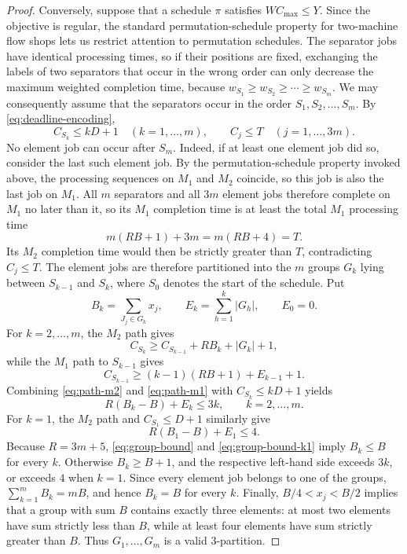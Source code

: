 \documentclass[12pt]{article}
\begin{document}
\begin{sloppypar}
\begin{proof}
Conversely, suppose that a schedule $\pi$ satisfies $W C_{\max}\le Y$. Since the objective is regular,
the standard permutation-schedule property for two-machine flow shops lets us restrict attention to
permutation schedules. The separator jobs have identical processing times, so if their positions are
fixed, exchanging the labels of two separators that occur in the wrong order can only decrease the
maximum weighted completion time, because $w_{S_1}\ge w_{S_2}\ge\cdots\ge w_{S_m}$. We may
consequently assume that the separators occur in the order $S_1,S_2,\dots,S_m$.
By \cref{eq:deadline-encoding},
\[
 C_{S_k}\le kD+1\quad(k=1,\dots,m),
 \qquad C_j\le T\quad(j=1,\dots,3m).
\]
No element job can occur after $S_m$. Indeed, if at least one element job did so, consider the last such element job. 
By the permutation-schedule property invoked above, the processing sequences on $M_1$ and $M_2$
coincide, so this job is also the last job on $M_1$. All $m$ separators and all $3m$ element jobs
therefore complete on $M_1$ no later than it, so its $M_1$ completion time is at least the total
$M_1$ processing time
\[
 m(RB+1)+3m=m(RB+4)=T.
\]
Its $M_2$ completion time would then be strictly greater than $T$, contradicting $C_j\le T$. The element
jobs are therefore partitioned into the $m$ groups $G_k$ lying between $S_{k-1}$ and $S_k$, where $S_0$
denotes the start of the schedule.
Put
\[
 B_k=\sum_{J_j\in G_k}x_j,
 \qquad E_k=\sum_{h=1}^{k}|G_h|,
 \qquad E_0=0.
\]
For $k=2,\dots,m$, the $M_2$ path gives
\begin{equation}\label{eq:path-m2}
 C_{S_k}\ge C_{S_{k-1}}+RB_k+|G_k|+1,
\end{equation}
while the $M_1$ path to $S_{k-1}$ gives
\begin{equation}\label{eq:path-m1}
 C_{S_{k-1}}\ge (k-1)(RB+1)+E_{k-1}+1.
\end{equation}
Combining \cref{eq:path-m2} and \cref{eq:path-m1} with $C_{S_k}\le kD+1$ yields
\begin{equation}\label{eq:group-bound}
 R(B_k-B)+E_k\le 3k,\qquad k=2,\dots,m.
\end{equation}
For $k=1$, the $M_2$ path and $C_{S_1}\le D+1$ similarly give
\begin{equation}\label{eq:group-bound-k1}
 R(B_1-B)+E_1\le4.
\end{equation}
Because $R=3m+5$, \cref{eq:group-bound} and \cref{eq:group-bound-k1} imply $B_k\le B$ for every
$k$. Otherwise $B_k\ge B+1$, and the respective left-hand side exceeds $3k$, or exceeds $4$ when
$k=1$. Since every element job belongs to one of the groups, $\sum_{k=1}^{m}B_k=mB$, and hence
$B_k=B$ for every $k$.
Finally, $B/4<x_j<B/2$ implies that a group with sum $B$ contains exactly three elements: at most two elements have sum strictly 
less than $B$, while at least four elements have sum strictly greater than $B$. Thus $G_1,\dots,G_m$ is a valid 3-partition.


\end{proof}
\end{sloppypar}
\end{document}

